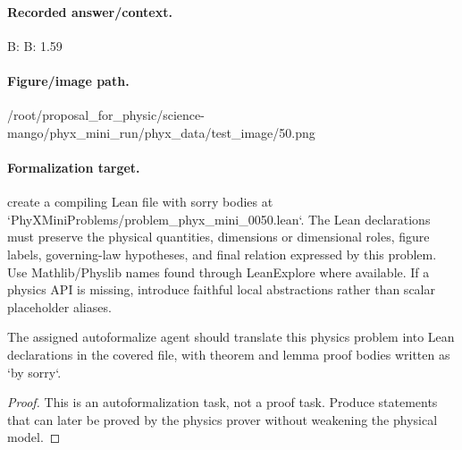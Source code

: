 \paragraph{Recorded answer/context.}
B: B: 1.59

\paragraph{Figure/image path.}
/root/proposal\_for\_physic/science-mango/phyx\_mini\_run/phyx\_data/test\_image/50.png

\paragraph{Formalization target.}
create a compiling Lean file with sorry bodies at `PhyXMiniProblems/problem\_phyx\_mini\_0050.lean`. The Lean declarations must preserve the physical quantities, dimensions or dimensional roles, figure labels, governing-law hypotheses, and final relation expressed by this problem.
Use Mathlib/Physlib names found through LeanExplore where available. If a physics API is missing, introduce faithful local abstractions rather than scalar placeholder aliases.

\begin{theorem}
\label{thm:physics:phyx_mini_0050:target}
The assigned autoformalize agent should translate this physics problem into Lean declarations in the covered file, with theorem and lemma proof bodies written as `by sorry`.
\end{theorem}
\begin{proof}
This is an autoformalization task, not a proof task. Produce statements that can later be proved by the physics prover without weakening the physical model.
\end{proof}

